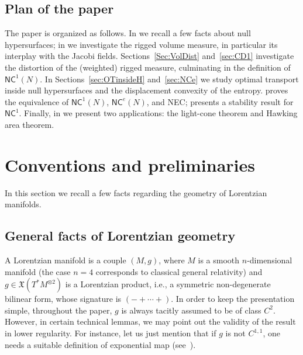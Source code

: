 \documentclass[12pt,a4paper]{amsart}
\theoremstyle{plain}
\theoremstyle{definition}
\numberwithin{equation}{section}
\newcommand{\NC}{\mathsf{NC}}
\newcommand{\vfield}{\mathfrak{X}}
\begin{document}
\subsection*{Plan of the paper}
The paper is organized as follows.
%
In  we recall a few facts about null
hypersurfaces; in  we investigate the rigged volume
measure, in particular its interplay with the Jacobi fields.
%
Sections~\ref{Sec:VolDist} and~\ref{sec:CD1} investigate the
distortion of the (weighted) rigged measure, culminating in the
definition of $\NC^1(N)$.
%
In Sections~\ref{sec:OTinsideH} and~\ref{sec:NCe} we study optimal
transport inside null hypersurfaces and the displacement convexity of
the entropy.
%
 proves the equivalence of $\NC^1(N)$, $\NC^e(N)$,
and NEC;  presents a stability result for $\NC^1$.
%
Finally, in  we present two applications: the
light-cone theorem and Hawking area theorem.



\section{Conventions and preliminaries}
\label{S:conventions}


In this section we recall a few facts regarding the geometry of
Lorentzian manifolds.


\subsection{General facts of Lorentzian geometry}


A Lorentzian manifold is a couple $(M,g)$, where $M$ is a smooth
$n$-dimensional manifold (the case $n=4$ corresponds to classical general relativity) and $g\in\vfield (T^*M^{\otimes 2})$ is a Lorentzian
product, i.e., a symmetric non-degenerate bilinear form, whose
signature is $(- +\cdots + )$.
%
In order to keep the presentation simple, throughout the
paper, $g$ is always tacitly assumed to be of class $C^2$.
However, in certain technical lemmas, we may point out the validity of the result in lower regularity.
%
For instance, let us just mention that if $g$ is not $C^{1,1}$, one needs a suitable
definition of exponential map (see~\cite{Graf}).
\end{document}
